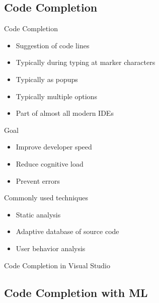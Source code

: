 \subsection{Code Completion}
\begin{frame}{\insertsubsection{}}
	\begin{fancycolumns}[animation=none]
		\begin{definition}{Code Completion}
			\begin{itemize}
				\item Suggestion of code lines
				\item Typically during typing at marker characters
				\item Typically as popups
				\item Typically multiple options
				\item Part of almost all modern IDEs
			\end{itemize}
		\end{definition}\pause
		\begin{note}{Goal}
			\begin{itemize}
				\item Improve developer speed
				\item Reduce cognitive load
				\item Prevent errors
			\end{itemize}
		\end{note}\pause
		\nextcolumn
		\begin{note}{Commonly used techniques}
			\begin{itemize}
				\item Static analysis
				\item Adaptive database of source code
				\item User behavior analysis
			\end{itemize}
		\end{note}\pause
		\begin{example}{Code Completion in Visual Studio}
			\centering{}
		\end{example}
	\end{fancycolumns}
\end{frame}

\subsection{Code Completion with ML}
\begin{frame}{\insertsubsection{}  }
		\begin{fancycolumns}[widths={66}]
			\centering{}
			\nextcolumn
			\centering{}
		\end{fancycolumns}
\end{frame}




